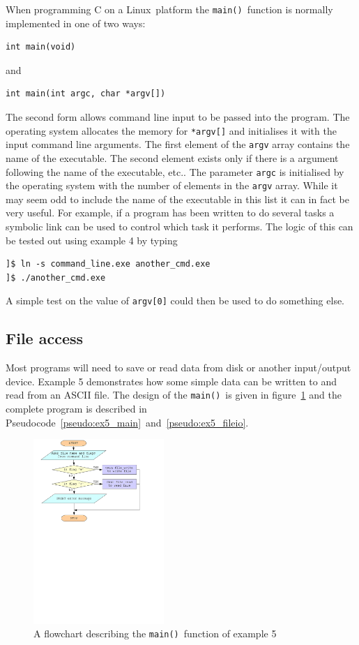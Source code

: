 \documentclass[11pt]{scrartcl}
\def\main{\texttt{main()}}
\def\psc{Pseudocode}
\def\linux{Linux}
\begin{document}
When programming C on a \linux\ platform the \main\ function is normally
implemented in one of two ways:
\begin{lstlisting}
int main(void)
\end{lstlisting}
and
\begin{lstlisting}
int main(int argc, char *argv[])
\end{lstlisting}
The second form allows command line input to be passed into the
program.  The operating system allocates the memory for
\texttt{*argv[]} and initialises it with the input command line
arguments.  The first element of the \texttt{argv} array contains the
name of the executable.  The second element exists only if there is a
argument following the name of the executable, etc..  The parameter
\texttt{argc} is initialised by the operating system with the number
of elements in the \texttt{argv} array.  While it may seem odd to
include the name of the executable in this list it can in fact be
very useful.  For example, if a program has been written to do several
tasks a symbolic link can be used to control which task it performs.
The logic of this can be tested out using example 4 by typing
\begin{verbatim}
]$ ln -s command_line.exe another_cmd.exe
]$ ./another_cmd.exe
\end{verbatim}
A simple test on the value of \texttt{argv[0]} could then be used to
do something else.

\subsection{File access}
Most programs will need to save or read data from disk or another
input/output device.  Example 5 demonstrates how some simple data can
be written to and read from an ASCII file.  The design of the \main\ is given in figure~\ref{figure:flowchart_ex5} and the complete program is described in \psc~\ref{pseudo:ex5_main}~and~\ref{pseudo:ex5_fileio}.
\begin{figure}[h]
\begin{center}
\includegraphics[height=7cm]{figures/ex5}
\caption{A flowchart describing the \main\ function of example 5
\label{figure:flowchart_ex5}}
\end{center}
\end{figure}
\end{document}
